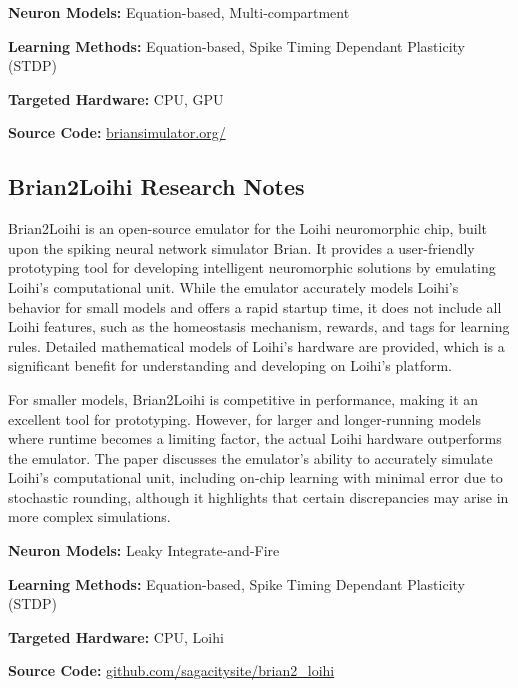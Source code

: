 \begin{tcolorbox}[enhanced,attach boxed title to top center={yshift=-3mm,yshifttext=-1mm}, colback=blue!5!white,colframe=blue!75!black,colbacktitle=red!80!black, title=Brian2 at a Glance,fonttitle=\bfseries, boxed title style={size=small,colframe=red!50!black} ]

\textbf{Neuron Models:} Equation-based, Multi-compartment

\textbf{Learning Methods:} Equation-based, Spike Timing Dependant Plasticity (STDP)  

\textbf{Targeted Hardware:} CPU, GPU 

\textbf{Source Code:} \href{https://briansimulator.org/}{briansimulator.org/}
\end{tcolorbox}
\subsection*{Brian2Loihi Research Notes}\label{Brian2Loihi}


Brian2Loihi is an open-source emulator for the Loihi neuromorphic chip, built upon the spiking neural network simulator Brian. It provides a user-friendly prototyping tool for developing intelligent neuromorphic solutions by emulating Loihi's computational unit. While the emulator accurately models Loihi's behavior for small models and offers a rapid startup time, it does not include all Loihi features, such as the homeostasis mechanism, rewards, and tags for learning rules. Detailed mathematical models of Loihi’s hardware are provided, which is a significant benefit for understanding and developing on Loihi’s platform.

For smaller models, Brian2Loihi is competitive in performance, making it an excellent tool for prototyping. However, for larger and longer-running models where runtime becomes a limiting factor, the actual Loihi hardware outperforms the emulator. The paper discusses the emulator’s ability to accurately simulate Loihi’s computational unit, including on-chip learning with minimal error due to stochastic rounding, although it highlights that certain discrepancies may arise in more complex simulations.

\begin{tcolorbox}[enhanced,attach boxed title to top center={yshift=-3mm,yshifttext=-1mm}, colback=blue!5!white,colframe=blue!75!black,colbacktitle=red!80!black, title=Brian2Loihi at a Glance,fonttitle=\bfseries, boxed title style={size=small,colframe=red!50!black} ]

\textbf{Neuron Models:} Leaky Integrate-and-Fire

\textbf{Learning Methods:} Equation-based, Spike Timing Dependant Plasticity (STDP)  

\textbf{Targeted Hardware:} CPU, Loihi 

\textbf{Source Code:} \href{https://github.com/sagacitysite/brian2_loihi}{github.com/sagacitysite/brian2\_loihi}
\end{tcolorbox}
